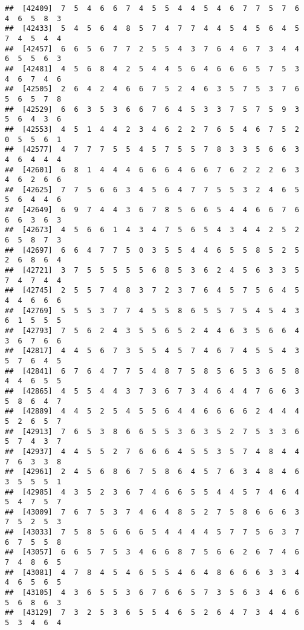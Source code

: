\documentclass[
]{book}
\begin{document}
\begin{verbatim}
##  [42409]  7  5  4  6  6  7  4  5  5  4  4  5  4  6  7  7  5  7  6  4  6  5  8  3
##  [42433]  5  4  5  6  4  8  5  7  4  7  7  4  4  5  4  5  6  4  5  7  4  5  4  4
##  [42457]  6  6  5  6  7  7  2  5  5  4  3  7  6  4  6  7  3  4  4  6  5  5  6  3
##  [42481]  4  5  6  8  4  2  5  4  4  5  6  4  6  6  6  5  7  5  3  4  6  7  4  6
##  [42505]  2  6  4  2  4  6  6  7  5  2  4  6  3  5  7  5  3  7  6  5  6  5  7  8
##  [42529]  6  6  3  5  3  6  6  7  6  4  5  3  3  7  5  7  5  9  3  5  6  4  3  6
##  [42553]  4  5  1  4  4  2  3  4  6  2  2  7  6  5  4  6  7  5  2  0  5  5  6  1
##  [42577]  4  7  7  7  5  5  4  5  7  5  5  7  8  3  3  5  6  6  3  4  6  4  4  4
##  [42601]  6  8  1  4  4  4  6  6  6  4  6  6  7  6  2  2  2  6  3  4  6  2  6  6
##  [42625]  7  7  5  6  6  3  4  5  6  4  7  7  5  5  3  2  4  6  5  5  6  4  4  6
##  [42649]  6  9  7  4  4  3  6  7  8  5  6  6  5  4  4  6  6  7  6  6  6  3  6  3
##  [42673]  4  5  6  6  1  4  3  4  7  5  6  5  4  3  4  4  2  5  2  6  5  8  7  3
##  [42697]  6  6  4  7  7  5  0  3  5  5  4  4  6  5  5  8  5  2  5  2  6  8  6  4
##  [42721]  3  7  5  5  5  5  5  6  8  5  3  6  2  4  5  6  3  3  5  7  4  7  4  4
##  [42745]  2  5  5  7  4  8  3  7  2  3  7  6  4  5  7  5  6  4  5  4  4  6  6  6
##  [42769]  5  5  5  3  7  7  4  5  5  8  6  5  5  7  5  4  5  4  3  6  1  5  5  5
##  [42793]  7  5  6  2  4  3  5  5  6  5  2  4  4  6  3  5  6  6  4  3  6  7  6  6
##  [42817]  4  4  5  6  7  3  5  5  4  5  7  4  6  7  4  5  5  4  3  5  7  6  4  5
##  [42841]  6  7  6  4  7  7  5  4  8  7  5  8  5  6  5  3  6  5  8  4  4  6  5  5
##  [42865]  4  5  5  4  4  3  7  3  6  7  3  4  6  4  4  7  6  6  3  5  8  6  4  7
##  [42889]  4  4  5  2  5  4  5  5  6  4  4  6  6  6  6  2  4  4  4  5  2  6  5  7
##  [42913]  7  6  5  3  8  6  6  5  5  3  6  3  5  2  7  5  3  3  6  5  7  4  3  7
##  [42937]  4  4  5  5  2  7  6  6  6  4  5  5  3  5  7  4  8  4  4  7  6  3  3  8
##  [42961]  2  4  5  6  8  6  7  5  8  6  4  5  7  6  3  4  8  4  6  3  5  5  5  1
##  [42985]  4  3  5  2  3  6  7  4  6  6  5  5  4  4  5  7  4  6  4  5  4  7  5  7
##  [43009]  7  6  7  5  3  7  4  6  4  8  5  2  7  5  8  6  6  6  3  7  5  2  5  3
##  [43033]  7  5  8  5  6  6  6  5  4  4  4  4  5  7  7  5  6  3  7  6  7  5  5  8
##  [43057]  6  6  5  7  5  3  4  6  6  8  7  5  6  6  2  6  7  4  6  7  4  8  6  5
##  [43081]  4  7  8  4  5  4  6  5  5  4  6  4  8  6  6  6  3  3  4  4  6  5  6  5
##  [43105]  4  3  6  5  5  3  6  7  6  6  5  7  3  5  6  3  4  6  6  5  6  8  6  3
##  [43129]  7  3  2  5  3  6  5  5  4  6  5  2  6  4  7  3  4  4  6  5  3  4  6  4

\end{verbatim}
\end{document}
